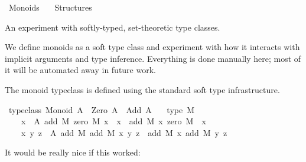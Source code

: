 %
\begin{isabellebody}%
%
%
\isadelimdocument
%
\endisadelimdocument
%
\isatagdocument
\isanewline
\isanewline
%
\isamarkuptrue%
%
\endisatagdocument
{\isafolddocument}%
%
\isadelimdocument
%
\endisadelimdocument
%
\isadelimtheory
%
\endisadelimtheory
%
\isatagtheory
{}\isamarkupfalse%
\ Monoids\isanewline
\ \ \ Structures\isanewline
{}%
\endisatagtheory
{\isafoldtheory}%
%
\isadelimtheory
%
\endisadelimtheory
%
\begin{isamarkuptext}%
An experiment with softly-typed, set-theoretic type classes.

We define monoids as a soft type class and experiment with how it interacts
with implicit arguments and type inference. Everything is done manually here;
most of it will be automated away in future work.%
\end{isamarkuptext}\isamarkuptrue%
%
\begin{isamarkuptext}%
The monoid typeclass is defined using the standard soft type
infrastructure.%
\end{isamarkuptext}\isamarkuptrue%
\isamarkupfalse%
\ {\isacharbrackleft}{\kern0pt}typeclass{\isacharbrackright}{\kern0pt}{\isacharcolon}{\kern0pt}\ {\isachardoublequoteopen}Monoid\ A\ {\isasymequiv}\ Zero\ A\ {\isacharampersand}{\kern0pt}\ Add\ A\ {\isacharampersand}{\kern0pt}\isanewline
\ \ type\ {\isacharparenleft}{\kern0pt}{\isasymlambda}M{\isachardot}{\kern0pt}\isanewline
\ \ \ \ {\isacharparenleft}{\kern0pt}{\isasymforall}x\ {\isacharcolon}{\kern0pt}\ A{\isachardot}{\kern0pt}\ add\ M\ {\isacharparenleft}{\kern0pt}zero\ M{\isacharparenright}{\kern0pt}\ x\ {\isacharequal}{\kern0pt}\ x\ {\isasymand}\ add\ M\ x\ {\isacharparenleft}{\kern0pt}zero\ M{\isacharparenright}{\kern0pt}\ {\isacharequal}{\kern0pt}\ x{\isacharparenright}{\kern0pt}\ {\isasymand}\isanewline
\ \ \ \ {\isacharparenleft}{\kern0pt}{\isasymforall}x\ y\ z\ {\isacharcolon}{\kern0pt}\ A{\isachardot}{\kern0pt}\ add\ M\ {\isacharparenleft}{\kern0pt}add\ M\ x\ y{\isacharparenright}{\kern0pt}\ z\ {\isacharequal}{\kern0pt}\ add\ M\ x\ {\isacharparenleft}{\kern0pt}add\ M\ y\ z{\isacharparenright}{\kern0pt}{\isacharparenright}{\kern0pt}{\isacharparenright}{\kern0pt}{\isachardoublequoteclose}%
\begin{isamarkuptext}%
It would be really nice if this worked:%
\end{isamarkuptext}\isamarkuptrue%
%
\begin{isamarkuptext}%

\end{isamarkuptext}
\end{isabellebody}
